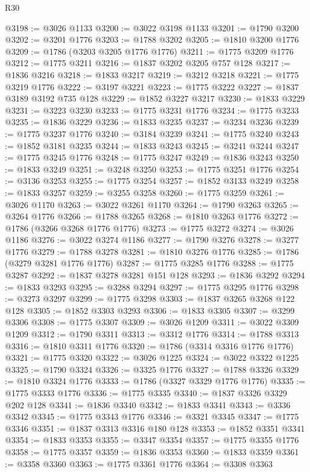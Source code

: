 \begin{lexlean}{R30}
\begin{coremodule}
@3198 := @3026 @1133
@3200 := @3022 @3198 @1133
@3201 := @1790 @3200
@3202 := @3201 @1776
@3203 := @1788 @3202
@3205 := @1810 @3200 @1776
@3209 := @1786 (@3203 @3205 @1776 @1776)
@3211 := @1775 @3209 @1776
@3212 := @1775 @3211
@3216 := @1837 @3202 @3205 @757 @128
@3217 := @1836 @3216
@3218 := @1833 @3217
@3219 := @3212 @3218
@3221 := @1775 @3219 @1776
@3222 := @3197 @3221
@3223 := @1775 @3222
@3227 := @1837 @3189 @3192 @735 @128
@3229 := @1852 @3227 @3217
@3230 := @1833 @3229
@3231 := @3223 @3230
@3233 := @1775 @3231 @1776
@3234 := @1775 @3233
@3235 := @1836 @3229
@3236 := @1833 @3235
@3237 := @3234 @3236
@3239 := @1775 @3237 @1776
@3240 := @3184 @3239
@3241 := @1775 @3240
@3243 := @1852 @3181 @3235
@3244 := @1833 @3243
@3245 := @3241 @3244
@3247 := @1775 @3245 @1776
@3248 := @1775 @3247
@3249 := @1836 @3243
@3250 := @1833 @3249
@3251 := @3248 @3250
@3253 := @1775 @3251 @1776
@3254 := @3136 @3253
@3255 := @1775 @3254
@3257 := @1852 @3133 @3249
@3258 := @1833 @3257
@3259 := @3255 @3258
@3260 := @1775 @3259
@3261 := @3026 @1170
@3263 := @3022 @3261 @1170
@3264 := @1790 @3263
@3265 := @3264 @1776
@3266 := @1788 @3265
@3268 := @1810 @3263 @1776
@3272 := @1786 (@3266 @3268 @1776 @1776)
@3273 := @1775 @3272
@3274 := @3026 @1186
@3276 := @3022 @3274 @1186
@3277 := @1790 @3276
@3278 := @3277 @1776
@3279 := @1788 @3278
@3281 := @1810 @3276 @1776
@3285 := @1786 (@3279 @3281 @1776 @1776)
@3287 := @1775 @3285 @1776
@3288 := @1775 @3287
@3292 := @1837 @3278 @3281 @151 @128
@3293 := @1836 @3292
@3294 := @1833 @3293
@3295 := @3288 @3294
@3297 := @1775 @3295 @1776
@3298 := @3273 @3297
@3299 := @1775 @3298
@3303 := @1837 @3265 @3268 @122 @128
@3305 := @1852 @3303 @3293
@3306 := @1833 @3305
@3307 := @3299 @3306
@3308 := @1775 @3307
@3309 := @3026 @1209
@3311 := @3022 @3309 @1209
@3312 := @1790 @3311
@3313 := @3312 @1776
@3314 := @1788 @3313
@3316 := @1810 @3311 @1776
@3320 := @1786 (@3314 @3316 @1776 @1776)
@3321 := @1775 @3320
@3322 := @3026 @1225
@3324 := @3022 @3322 @1225
@3325 := @1790 @3324
@3326 := @3325 @1776
@3327 := @1788 @3326
@3329 := @1810 @3324 @1776
@3333 := @1786 (@3327 @3329 @1776 @1776)
@3335 := @1775 @3333 @1776
@3336 := @1775 @3335
@3340 := @1837 @3326 @3329 @202 @128
@3341 := @1836 @3340
@3342 := @1833 @3341
@3343 := @3336 @3342
@3345 := @1775 @3343 @1776
@3346 := @3321 @3345
@3347 := @1775 @3346
@3351 := @1837 @3313 @3316 @180 @128
@3353 := @1852 @3351 @3341
@3354 := @1833 @3353
@3355 := @3347 @3354
@3357 := @1775 @3355 @1776
@3358 := @1775 @3357
@3359 := @1836 @3353
@3360 := @1833 @3359
@3361 := @3358 @3360
@3363 := @1775 @3361 @1776
@3364 := @3308 @3363

\end{coremodule}
\end{lexlean}
